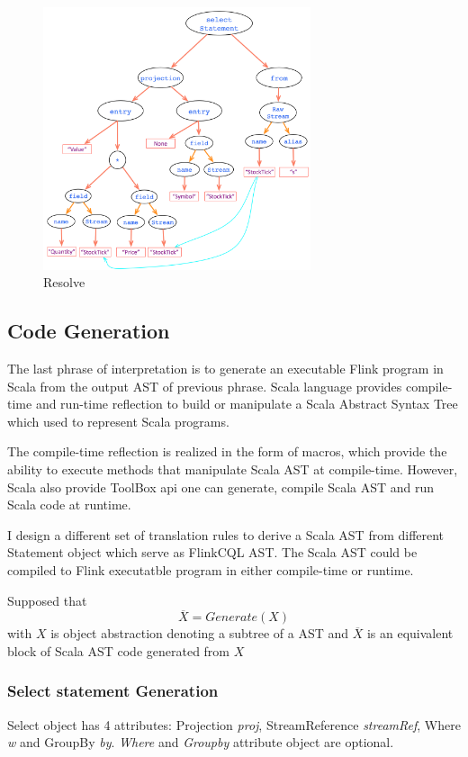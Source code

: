 \begin{figure}[h!] 
\centering    
\includegraphics[width=0.7\textwidth]{Resolve}
\caption{Resolve}
\label{fig:Resolve}
\end{figure}


\subsection{Code Generation}
The last phrase of interpretation is to generate an executable Flink program in Scala from the output AST of previous phrase. Scala language provides compile-time and run-time reflection to build or manipulate a Scala Abstract Syntax Tree which used to represent Scala programs. 

The compile-time reflection is realized in the form of macros, which provide the ability to execute methods that manipulate Scala AST at compile-time. However, Scala also provide ToolBox api one can generate, compile Scala AST and run Scala code at runtime. 

I design a different set of translation rules to derive a Scala AST from different Statement object which serve as FlinkCQL AST. The Scala AST could be compiled to Flink executatble program in either compile-time or runtime.

Supposed that 
\begin{equation}
	\overline{X} = Generate(X)
\end{equation}
 with $X$ is object abstraction denoting a subtree of a AST and $\overline{X}$ is an equivalent block of Scala AST code generated from $X$

\subsubsection*{Select statement Generation}
Select object has 4 attributes: Projection \textit{proj}, StreamReference \textit{streamRef}, Where \textit{w} and GroupBy \textit{by}. \textit{Where} and \textit{Groupby} attribute object are optional. 

